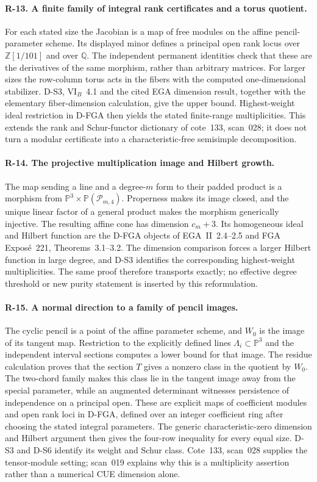 \paragraph{R-13. A finite family of integral rank certificates and a torus quotient.}
For each stated size the Jacobian is a map of free modules on the affine pencil-parameter scheme. Its displayed minor defines a principal open rank locus over $\mathbb Z[1/101]$ and over $\mathbb Q$. The independent permanent identities check that these are the derivatives of the same morphism, rather than arbitrary matrices. For larger sizes the row-column torus acts in the fibers with the computed one-dimensional stabilizer. D-S3, VI$_B$~4.1 and the cited EGA dimension result, together with the elementary fiber-dimension calculation, give the upper bound. Highest-weight ideal restriction in D-FGA then yields the stated finite-range multiplicities. This extends the rank and Schur-functor dictionary of cote~133, scan~028; it does not turn a modular certificate into a characteristic-free semisimple decomposition.

\paragraph{R-14. The projective multiplication image and Hilbert growth.}
The map sending a line and a degree-$m$ form to their padded product is a morphism from $\mathbb P^3\times\mathbb P(\mathcal P_{m,4})$. Properness makes its image closed, and the unique linear factor of a general product makes the morphism generically injective. The resulting affine cone has dimension $c_m+3$. Its homogeneous ideal and Hilbert function are the D-FGA objects of EGA~II~2.4--2.5 and FGA Expos\'e~221, Theorems~3.1--3.2. The dimension comparison forces a larger Hilbert function in large degree, and D-S3 identifies the corresponding highest-weight multiplicities. The same proof therefore transports exactly; no effective degree threshold or new purity statement is inserted by this reformulation.

\paragraph{R-15. A normal direction to a family of pencil images.}
The cyclic pencil is a point of the affine parameter scheme, and $W_0$ is the image of its tangent map. Restriction to the explicitly defined lines $\Lambda_i\subset\mathbb P^3$ and the independent interval sections computes a lower bound for that image. The residue calculation proves that the section $T$ gives a nonzero class in the quotient by $W_0$. The two-chord family makes this class lie in the tangent image away from the special parameter, while an augmented determinant witnesses persistence of independence on a principal open. These are explicit maps of coefficient modules and open rank loci in D-FGA, defined over an integer coefficient ring after choosing the stated integral parameters. The generic characteristic-zero dimension and Hilbert argument then gives the four-row inequality for every equal size. D-S3 and D-S6 identify its weight and Schur class. Cote~133, scan~028 supplies the tensor-module setting; scan~019 explains why this is a multiplicity assertion rather than a numerical CUE dimension alone.

